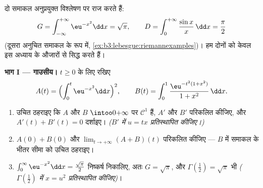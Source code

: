 \begin{problem}[{सप्ताहांत समस्या --- गाउसीय समाकल और दिरिक्ले का
समाकल, केवल प्राचलों से}]
\label{pb:b3:lebesgue:1}
दो समाकल अनुप्रयुक्त विश्लेषण पर राज करते हैं:
\[
G = \int_{-\infty}^{+\infty}\eu^{-x^2}\dd x = \sqrt\pi,
\qquad
D = \int_0^{+\infty}\frac{\sin x}{x}\,\dd x = \frac\pi2
\]
(दूसरा अनुचित समाकल के रूप में, \cref{ex:b3:lebesgue:riemannexamples})। हम दोनों को केवल इस
अध्याय के औजारों से सिद्ध करते हैं।

\medskip
\noindent\textbf{भाग I --- गाउसीय।} $t \geq 0$ के लिए रखिए
\[
A(t) = \Bigl(\int_0^t\eu^{-x^2}\dd x\Bigr)^{2},
\qquad
B(t) = \int_0^1\frac{\eu^{-t^2(1 + x^2)}}{1 + x^2}\,\dd x .
\]
\begin{enumerate}
  \item उचित ठहराइए कि $A$ और $B$ $\intoo0{+\infty}$ पर $\mathcal C^1$ हैं, $A'$
        और $B'$ परिकलित कीजिए, और $A'(t) + B'(t) = 0$ दर्शाइए। \emph{($B'$
        में $u =
        tx$ प्रतिस्थापित कीजिए।)}
  \item $A(0) + B(0)$ और $\lim_{t\to+\infty}(A + B)(t)$ परिकलित कीजिए --- $B$ में समाकल के भीतर
        सीमा को उचित ठहराइए।
  \item $\int_0^\infty \eu^{-x^2}\dd x =
        \frac{\sqrt\pi}2$ निष्कर्ष निकालिए, अतः $G = \sqrt\pi$, और $\Gamma(\tfrac12) = \sqrt\pi$ भी \emph{($\Gamma(\frac12)$
        में $x =
        u^2$ प्रतिस्थापित कीजिए)}।
\end{enumerate}


\end{problem}
